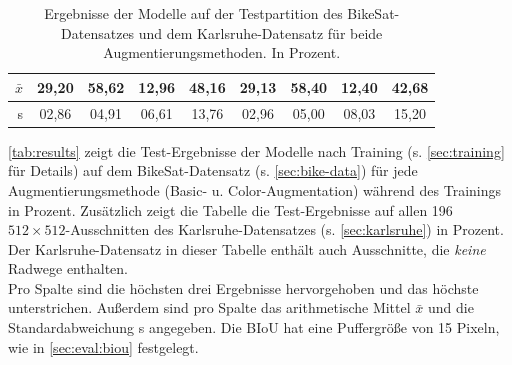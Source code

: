 \begin{table}[ht]
\begin{tabular}{l|cc|cc|cc|cc}
		\bottomrule
		\multicolumn{1}{r|}{$\bar{x}$} & 29,20 & 58,62 & 12,96 & 48,16 & 29,13 & 58,40 & 12,40 & 42,68 \\
		\midrule
		\multicolumn{1}{r|}{s} & 02,86 & 04,91 & 06,61 & 13,76 & 02,96 & 05,00 & 08,03 & 15,20 \\


	\end{tabular}
	\caption{Ergebnisse der Modelle auf der Testpartition des BikeSat-Datensatzes und dem Karlsruhe-Datensatz
	für beide Augmentierungsmethoden. 
    In Prozent.}
	\label{tab:results}
\end{table}

\autoref{tab:results} zeigt die Test-Ergebnisse der Modelle nach Training (s. \autoref{sec:training} für Details) auf dem BikeSat-Datensatz 
(s. \autoref{sec:bike-data}) für jede Augmentierungsmethode (Basic- u. Color-Augmentation) während des Trainings in Prozent. 
Zusätzlich zeigt die Tabelle die Test-Ergebnisse auf allen 196 $512{\times}512$-Ausschnitten 
des Karlsruhe-Datensatzes (s. \autoref{sec:karlsruhe}) in Prozent. Der Karlsruhe-Datensatz in dieser Tabelle
enthält auch Ausschnitte, die \textit{keine} Radwege enthalten. \\ 
Pro Spalte sind die höchsten drei Ergebnisse hervorgehoben und das höchste unterstrichen. 
Außerdem sind pro Spalte das arithmetische Mittel $\bar{x}$ und die Standardabweichung s angegeben. 
Die \ac{BIoU} hat eine Puffergröße von 15 Pixeln, wie in \autoref{sec:eval:biou} festgelegt.
